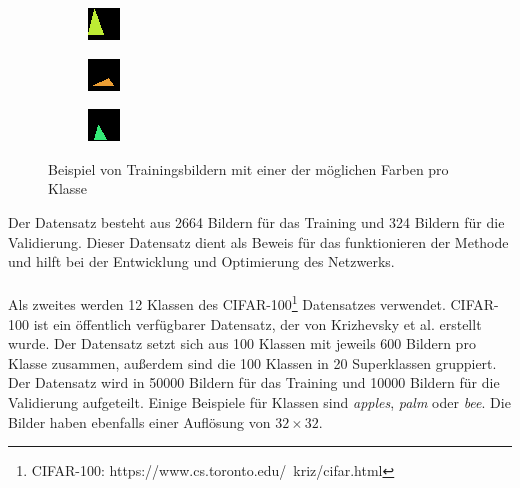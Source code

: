 \begin{figure}[H]
  \begin{subfigure}
    \centering
    \includegraphics[width=.15\textwidth]{resources/dataset/dummy/triangle41.png}
  \end{subfigure}
  \begin{subfigure}
    \centering
    \includegraphics[width=.15\textwidth]{resources/dataset/dummy/triangle49.png}
  \end{subfigure}
  \begin{subfigure}
    \centering
    \includegraphics[width=.15\textwidth]{resources/dataset/dummy/triangle51.png}
  \end{subfigure}
  \caption{Beispiel von Trainingsbildern mit einer der möglichen Farben pro Klasse}
  \label{image:dummy}
\end{figure}

Der Datensatz besteht aus 2664 Bildern für das Training und 324 Bildern für die Validierung.
Dieser Datensatz dient als Beweis für das funktionieren der Methode und hilft bei der Entwicklung und Optimierung des Netzwerks.
\\
\\
Als zweites werden 12 Klassen des CIFAR-100\footnote{CIFAR-100: https://www.cs.toronto.edu/~kriz/cifar.html} Datensatzes verwendet. CIFAR-100 ist
ein öffentlich verfügbarer Datensatz, der von Krizhevsky et al. erstellt wurde. Der Datensatz setzt sich aus 100 Klassen mit jeweils 600
Bildern pro Klasse zusammen, außerdem sind die 100 Klassen in 20 Superklassen gruppiert. Der Datensatz wird in 50000 Bildern für das Training und
10000 Bildern für die Validierung aufgeteilt. Einige Beispiele für Klassen sind \textit{apples}, \textit{palm} oder \textit{bee}.
Die Bilder haben ebenfalls einer Auflösung von $ 32 \times 32 $.

